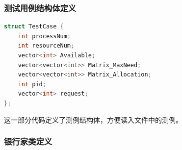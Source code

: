 \documentclass[UTF8]{ctexart}
\begin{document}
\subsubsection{测试用例结构体定义}
\begin{lstlisting}[frame=shadowbox, language=C]
struct TestCase {
    int processNum;      
    int resourceNum;     
    vector<int> Available;  
    vector<vector<int>> Matrix_MaxNeed;    
    vector<vector<int>> Matrix_Allocation; 
    int pid;             
    vector<int> request;  
};
\end{lstlisting}

这一部分代码定义了测例结构体，方便读入文件中的测例。

\subsubsection{银行家类定义}
\end{document}
